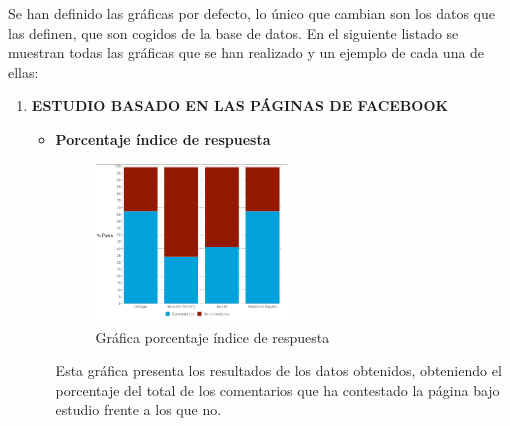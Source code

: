 Se han definido las gráficas por defecto, lo único que cambian son los datos que las definen, que son cogidos de la base de datos. En el siguiente listado se muestran todas las gráficas que se han realizado y un ejemplo de cada una de ellas: 
\begin{enumerate}
\item \textbf{ESTUDIO BASADO EN LAS PÁGINAS DE FACEBOOK}
\begin{itemize}
\item \textbf{Porcentaje índice de respuesta}\\
\begin{figure}[H]
\centering
\includegraphics[width=2in]{figuras/contestados.png}
\caption{Gráfica porcentaje índice de respuesta} \label{fig:contestados}
\end{figure}
Esta gráfica presenta los resultados de los datos obtenidos, obteniendo el porcentaje del total de los comentarios que ha contestado la página bajo estudio frente a los que no.  


\end{itemize}
\end{enumerate}
